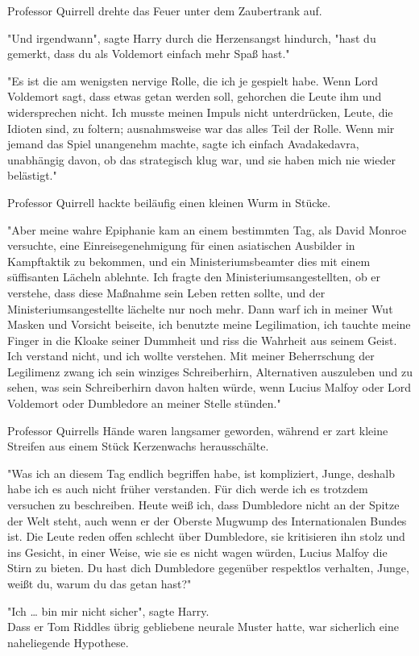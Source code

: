 {Professor Quirrell drehte das Feuer unter dem Zaubertrank auf.

"Und irgendwann", sagte Harry durch die Herzensangst hindurch, "hast du gemerkt, dass du als Voldemort einfach mehr Spaß hast."

"Es ist die am wenigsten nervige Rolle, die ich je gespielt habe. Wenn Lord Voldemort sagt, dass etwas getan werden soll, gehorchen die Leute ihm und widersprechen nicht. Ich musste meinen Impuls nicht unterdrücken, Leute, die Idioten sind, zu foltern; ausnahmsweise war das alles Teil der Rolle. Wenn mir jemand das Spiel unangenehm machte, sagte ich einfach Avadakedavra, unabhängig davon, ob das strategisch klug war, und sie haben mich nie wieder belästigt."

Professor Quirrell hackte beiläufig einen kleinen Wurm in Stücke.

"Aber meine wahre Epiphanie kam an einem bestimmten Tag, als David Monroe versuchte, eine Einreisegenehmigung für einen asiatischen Ausbilder in Kampftaktik zu bekommen, und ein Ministeriumsbeamter dies mit einem süffisanten Lächeln ablehnte. Ich fragte den Ministeriumsangestellten, ob er verstehe, dass diese Maßnahme sein Leben retten sollte, und der Ministeriumsangestellte lächelte nur noch mehr. Dann warf ich in meiner Wut Masken und Vorsicht beiseite, ich benutzte meine Legilimation, ich tauchte meine Finger in die Kloake seiner Dummheit und riss die Wahrheit aus seinem Geist. Ich verstand nicht, und ich wollte verstehen. Mit meiner Beherrschung der Legilimenz zwang ich sein winziges Schreiberhirn, Alternativen auszuleben und zu sehen, was sein Schreiberhirn davon halten würde, wenn Lucius Malfoy oder Lord Voldemort oder Dumbledore an meiner Stelle stünden."

Professor Quirrells Hände waren langsamer geworden, während er zart kleine Streifen aus einem Stück Kerzenwachs herausschälte.

"Was ich an diesem Tag endlich begriffen habe, ist kompliziert, Junge, deshalb habe ich es auch nicht früher verstanden. Für dich werde ich es trotzdem versuchen zu beschreiben. Heute weiß ich, dass Dumbledore nicht an der Spitze der Welt steht, auch wenn er der Oberste Mugwump des Internationalen Bundes ist. Die Leute reden offen schlecht über Dumbledore, sie kritisieren ihn stolz und ins Gesicht, in einer Weise, wie sie es nicht wagen würden, Lucius Malfoy die Stirn zu bieten. Du hast dich Dumbledore gegenüber respektlos verhalten, Junge, weißt du, warum du das getan hast?"

"Ich … bin mir nicht sicher", sagte Harry.\\ Dass er Tom Riddles übrig gebliebene neurale Muster hatte, war sicherlich eine naheliegende Hypothese.

}
